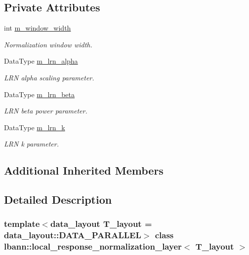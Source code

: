 \subsection*{Private Attributes}
\begin{DoxyCompactItemize}
\item 
int \hyperlink{classlbann_1_1local__response__normalization__layer_a4914619a19eb43efcf8240b8a1e0c090}{m\+\_\+window\+\_\+width}
\begin{DoxyCompactList}\small\item\em Normalization window width. \end{DoxyCompactList}\item 
Data\+Type \hyperlink{classlbann_1_1local__response__normalization__layer_a85c25a68888e2e9d163a820326fc09ff}{m\+\_\+lrn\+\_\+alpha}
\begin{DoxyCompactList}\small\item\em L\+RN alpha scaling parameter. \end{DoxyCompactList}\item 
Data\+Type \hyperlink{classlbann_1_1local__response__normalization__layer_ad06848e9d59664be86aecbc1e2ba556f}{m\+\_\+lrn\+\_\+beta}
\begin{DoxyCompactList}\small\item\em L\+RN beta power parameter. \end{DoxyCompactList}\item 
Data\+Type \hyperlink{classlbann_1_1local__response__normalization__layer_a896f875d6f6a763c1cb0dbd43679164e}{m\+\_\+lrn\+\_\+k}
\begin{DoxyCompactList}\small\item\em L\+RN k parameter. \end{DoxyCompactList}\end{DoxyCompactItemize}
\subsection*{Additional Inherited Members}


\subsection{Detailed Description}
\subsubsection*{template$<$data\+\_\+layout T\+\_\+layout = data\+\_\+layout\+::\+D\+A\+T\+A\+\_\+\+P\+A\+R\+A\+L\+L\+EL$>$\newline
class lbann\+::local\+\_\+response\+\_\+normalization\+\_\+layer$<$ T\+\_\+layout $>$}

